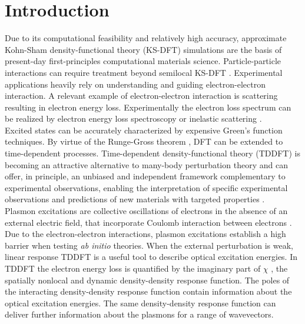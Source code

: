 \documentclass[aps,amsmath,amssymb, preprint, 12pt]{revtex4-1}
\begin{document}
\section{Introduction}



\noindent Due to its computational feasibility and relatively high accuracy, approximate Kohn-Sham density-functional theory (KS-DFT) simulations are the basis of present-day first-principles computational materials science. Particle-particle interactions can require treatment beyond semilocal KS-DFT \cite{ORR02}. Experimental applications heavily rely on understanding and guiding electron-electron interaction. A relevant example of electron-electron interaction is scattering resulting in electron energy loss. Experimentally the electron loss spectrum can be realized by electron energy loss spectroscopy or inelastic scattering \cite{R06, SSSK95}.\\ 

Excited states can be accurately characterized by expensive Green’s function techniques. By virtue of the Runge-Gross theorem \cite{RG84}, DFT can be extended to time-dependent processes. Time-dependent density-functional theory (TDDFT) is becoming an attractive alternative to many-body perturbation theory and can offer, in principle, an unbiased and independent framework complementary to experimental observations, enabling the interpretation of specific experimental observations and predictions of new materials with targeted properties \cite{U11}.\\

Plasmon excitations are collective oscillations of electrons in the absence of an external electric field, that incorporate Coulomb interaction between electrons \cite{P64, GV05}. Due to the electron-electron interactions, plasmon excitations establish a high barrier when testing \textit{ab initio} theories. When the external perturbation is weak, linear response TDDFT \cite{PGG96} is a useful tool to describe optical excitation energies. In TDDFT the electron energy loss is quantified by the imaginary part of $ \chi $ , the spatially nonlocal and dynamic density-density response function. The poles of the interacting density-density response function contain information about the optical excitation energies. The same density-density response function can deliver further information about the plasmons for a range of wavevectors.\\  
\end{document}
